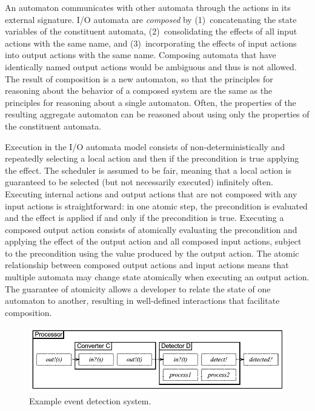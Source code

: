 An automaton communicates with other automata through the actions in its external signature.
I/O automata are \emph{composed} by (1)~concatenating the state variables of the constituent automata, (2)~consolidating the effects of all input actions with the same name, and (3)~incorporating the effects of input actions into output actions with the same name.
Composing automata that have identically named output actions would be ambiguous and thus is not allowed.
The result of composition is a new automaton, so that the principles for reasoning about the behavior of a composed system are the same as the principles for reasoning about a single automaton.
Often, the properties of the resulting aggregate automaton can be reasoned about using only the properties of the constituent automata.

Execution in the I/O automata model consists of non-deterministically and repeatedly selecting a local action and then if the precondition is true applying the effect.
The scheduler is assumed to be fair, meaning that a local action is guaranteed to be selected (but not necessarily executed) infinitely often.
Executing internal actions and output actions that are not composed with any input actions is straightforward: in one atomic step, the precondition is evaluated and the effect is applied if and only if the precondition is true.
Executing a composed output action consists of atomically evaluating the precondition and applying the effect of the output action and all composed input actions,  subject to the precondition using the value produced by the output action.
The atomic relationship between composed output actions and input actions means that multiple automata may change state atomically when executing an output action.
The guarantee of atomicity allows a developer to relate the state of one automaton to another, resulting in well-defined interactions that facilitate composition.

\begin{figure}
\center
\includegraphics[width=\columnwidth]{system_model}
\caption{Example event detection system.}
\label{sys_model}
\end{figure}

